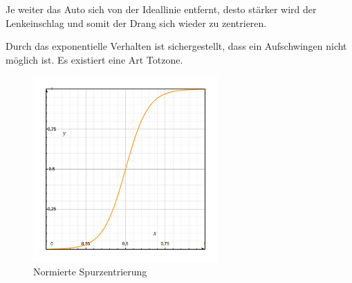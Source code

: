 \documentclass[a4paper,12pt]{report}
\begin{document}
	Je weiter das Auto sich von der Ideallinie entfernt, desto stärker wird der Lenkeinschlag und somit der Drang sich wieder zu zentrieren.
	
	Durch das exponentielle Verhalten ist sichergestellt, dass ein Aufschwingen nicht möglich ist. Es existiert eine Art Totzone.
	
	\begin{figure}[ht]
		\centering
		\includegraphics[width=200pt,keepaspectratio]{assets/spurzentrierung}
		\caption{Normierte Spurzentrierung}
		\label{img_spurzentrierung_function}
	\end{figure}
	
	
\end{document}
